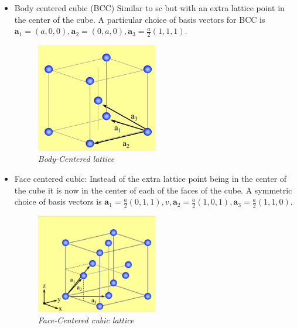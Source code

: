 \documentclass[11pt]{article}
\numberwithin{equation}{section}
\begin{document}
\begin{itemize}
\item Body centered cubic (BCC)
Similar to sc but with an extra lattice point in the center of the cube. A particular choice of basis vectors for BCC is $\textbf{a}_1 = (a,0,0),\textbf{a}_2 = (0,a,0),\textbf{a}_3 = \frac{a}{2}(1,1,1) $. 
\begin{figure}[H]
\centering
\includegraphics[width=0.5\textwidth]{image.png}
\caption{\label{fig:2}\emph{Body-Centered lattice}}
\end{figure}
\item Face centered cubic:
Instead of the extra lattice point being in the center of the cube it is now in the center of each of the faces of the cube. A symmetric choice of basis vectors is $\textbf{a}_1 = \frac{a}{2}(0,1,1),v,\textbf{a}_2 = \frac{a}{2}(1,0,1),\textbf{a}_3 = \frac{a}{2}(1,1,0)$.
\begin{figure}[H]
\centering
\includegraphics[width=0.5\textwidth]{Graph5.png}
\caption{\label{fig:2}\emph{Face-Centered cubic lattice}}
\end{figure}

\end{itemize}
\end{document}
